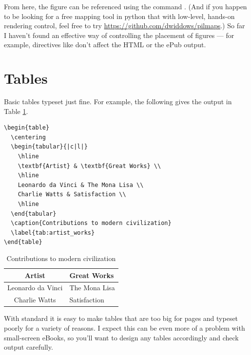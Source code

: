 From here, the figure can be referenced using the command 
. (And if you happen to be looking for a free mapping tool in python that
with low-level, hands-on rendering control, feel free to try {\small \url{https://github.com/dwiddows/pilmaps}}.) 
So far I haven't found an effective way of controlling the placement of figures --- for example, directives
like  don't affect the HTML or the ePub output.

\section{Tables}

Basic tables typeset just fine. For example, the following \latex gives the output in Table \ref{tab:artist_works}.

\begin{verbatim}
\begin{table}
  \centering
  \begin{tabular}{|c|l|}
    \hline
    \textbf{Artist} & \textbf{Great Works} \\
    \hline
    Leonardo da Vinci & The Mona Lisa \\
    Charlie Watts & Satisfaction \\
    \hline
  \end{tabular}
  \caption{Contributions to modern civilization}
  \label{tab:artist_works}
\end{table}
\end{verbatim}

\begin{table}
 \begin{center}
  \begin{tabular}{|c|l|}
    \hline
    \textbf{Artist} & \textbf{Great Works} \\
    \hline
    Leonardo da Vinci & The Mona Lisa \\
    Charlie Watts & Satisfaction \\
    \hline
  \end{tabular}
  \caption{Contributions to modern civilization}
  \label{tab:artist_works}
 \end{center}
\end{table}

With standard \latex it is easy to make tables that are too big for pages and typeset poorly for a variety of reasons.
I expect this can be even more of a problem with small-screen eBooks, so you'll want to design any tables accordingly
and check output carefully.

